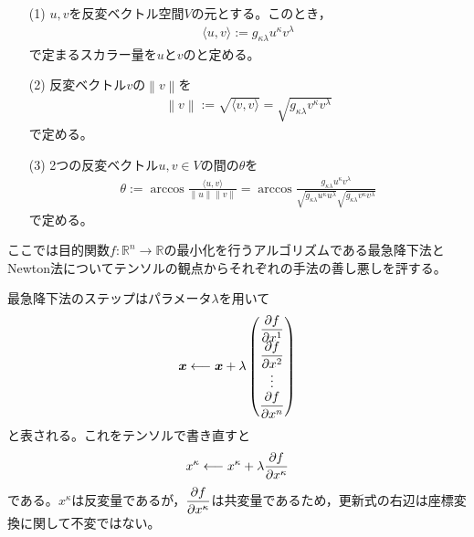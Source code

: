 \documentclass[uplatex]{jsarticle}
\begin{document}
\sukima{}\par
\begin{teigi}
  \begin{enumerate}
    \item[(1)] $u,v$を反変ベクトル空間$V$の元とする。このとき，\begin{align}
      \langle u,v \rangle := g_{\kappa\lambda} u^{\kappa} v^{\lambda}
    \end{align}
    で定まるスカラー量を$u$と$v$のと定める。
    \item[(2)] 反変ベクトル$v$の$\left\| v \right\|$を
    \begin{align}
      \left\| v \right\| := \sqrt{\langle v, v \rangle} = \sqrt{g_{\kappa\lambda} v^{\kappa} v^{\lambda}}
    \end{align}
    で定める。
    \item[(3)] 2つの反変ベクトル$u,v \in V$の間の$\theta$を
    \begin{align}
      \theta := \arccos \frac{\langle u,v \rangle}{\left\| u \right\| \left\| v \right\|} = \arccos \frac{g_{\kappa\lambda} u^{\kappa}v^{\lambda}}{\sqrt{g_{\kappa\lambda} u^{\kappa}u^{\lambda}}\sqrt{g_{\kappa\lambda} v^{\kappa}v^{\lambda}}}
    \end{align}
    で定める。
  \end{enumerate}
\end{teigi}


\sukima{}\par
ここでは目的関数$f \colon \mathbb{R}^{n} \longrightarrow \mathbb{R}$の最小化を行うアルゴリズムである最急降下法とNewton法についてテンソルの観点からそれぞれの手法の善し悪しを評する。

最急降下法のステップはパラメータ$\lambda$を用いて
\begin{align}
  \bm{x} \longleftarrow \bm{x} + \lambda \begin{pmatrix}
    \dfrac{\partial f}{\partial x^{1}} \\ \dfrac{\partial f}{\partial x^{2}} \\ \vdots \\ \dfrac{\partial f}{\partial x^{n}}
  \end{pmatrix}
\end{align}
と表される。これをテンソルで書き直すと
\begin{align}
  x^{\kappa} \longleftarrow x^{\kappa} + \lambda \dfrac{\partial f}{\partial x^{\kappa}} \label{eq:12-1-19}
\end{align}
である。$x^{\kappa}$は反変量であるが，$\dfrac{\partial f}{\partial x^{\kappa}}$は共変量であるため，更新式の右辺は座標変換に関して不変ではない。
\end{document}
